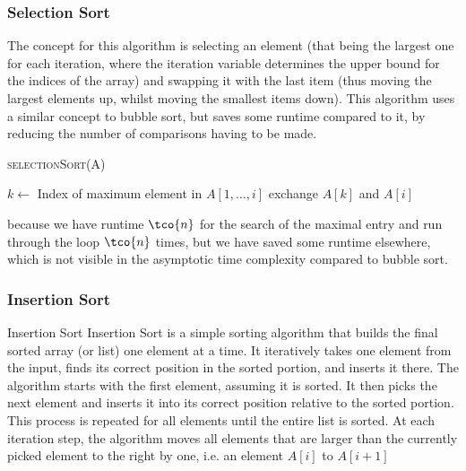 \subsubsection{Selection Sort}
The concept for this algorithm is selecting an element (that being the largest one for each iteration, where the iteration variable determines the upper bound for the indices of the array) and swapping it with the last item (thus moving the largest elements up, whilst moving the smallest items down). This algorithm uses a similar concept to bubble sort, but saves some runtime compared to it, by reducing the number of comparisons having to be made.
\begin{algorithm}
    \begin{spacing}{1.2}
        \caption{\textsc{selectionSort(A)}}
        \begin{algorithmic}[1]
                \State $k \gets$ Index of maximum element in $A[1, \ldots, i]$ 
                \State exchange $A[k]$ and $A[i]$
            \EndFor
        \end{algorithmic}
    \end{spacing}
\end{algorithm}

 because we have runtime $\tco{n}$ for the search of the maximal entry and run through the loop $\tco{n}$ times, but we have saved some runtime elsewhere, which is not visible in the asymptotic time complexity compared to bubble sort.



\newpage
\subsubsection{Insertion Sort}
\begin{definition}[]{Insertion Sort}
    Insertion Sort is a simple sorting algorithm that builds the final sorted array (or list) one element at a time. It iteratively takes one element from the input, finds its correct position in the sorted portion, and inserts it there. The algorithm starts with the first element, assuming it is sorted. It then picks the next element and inserts it into its correct position relative to the sorted portion. This process is repeated for all elements until the entire list is sorted. At each iteration step, the algorithm moves all elements that are larger than the currently picked element to the right by one, i.e. an element $A[i]$ to $A[i + 1]$
\end{definition}

